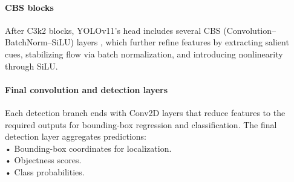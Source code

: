 \paragraph{CBS blocks}
After C3k2 blocks, YOLOv11's head includes several CBS (Convolution–BatchNorm–SiLU) layers \cite{81_noauthor_what_2024}, which further refine features by extracting salient cues, stabilizing flow via batch normalization, and introducing nonlinearity through SiLU.

\paragraph{Final convolution and detection layers}  
Each detection branch ends with Conv2D layers that reduce features to the required outputs for bounding-box regression and classification. The final detection layer aggregates predictions:\\
    • Bounding-box coordinates for localization.\\  
    • Objectness scores.\\  
    • Class probabilities.\\

